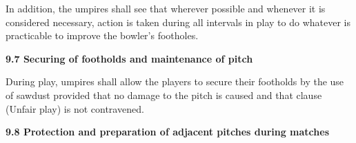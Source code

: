 \documentclass[12pt]{article}
\begin{document}
\vspace{\baselineskip}
\begin{adjustwidth}{0.0in}{0.24in}
{\fontsize{9pt}{10.8pt}\selectfont In addition, the umpires shall see that wherever possible and whenever it is considered necessary, action is taken during all intervals in play to do whatever is practicable to improve the bowler’s footholes.\par}\par

\end{adjustwidth}


\vspace{\baselineskip}

\vspace{\baselineskip}

\vspace{\baselineskip}

\vspace{\baselineskip}

\vspace{\baselineskip}

\vspace{\baselineskip}
\begin{Center}
{\fontsize{8pt}{9.6pt}\par}
\end{Center}\par


\vspace{\baselineskip}
{\fontsize{11pt}{13.2pt}\selectfont \textbf{9.7 \tabto{0.47in} Securing of footholds and maintenance of pitch}\par}\par


\vspace{\baselineskip}
\begin{adjustwidth}{0.0in}{0.07in}
{\fontsize{9pt}{10.8pt}\selectfont During play, umpires shall allow the players to secure their footholds by the use of sawdust provided that no damage to the pitch is caused and that clause (Unfair play) is not contravened.\par}\par

\end{adjustwidth}


\vspace{\baselineskip}
{\fontsize{11pt}{13.2pt}\selectfont \textbf{9.8 \tabto{0.47in} Protection and preparation of adjacent pitches during matches}\par}\par
\end{document}
